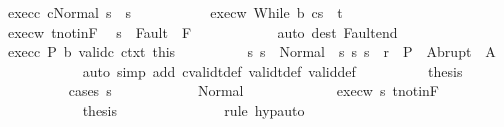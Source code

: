 \begin{isabellebody}
\ exec{\isacharunderscore}c{\isacharcolon}\ {\isachardoublequoteopen}{\isasymGamma}{\isasymturnstile}{\isasymlangle}c{\isacharcomma}Normal\ s{\isasymrangle}\ {\isasymRightarrow}\ s{\isacharprime}{\isachardoublequoteclose}\ \isanewline
\ \ \ \ \ \ \ \ \isamarkupfalse%
\ exec{\isacharunderscore}w{\isacharcolon}\ {\isachardoublequoteopen}{\isasymGamma}{\isasymturnstile}{\isasymlangle}While\ b\ c{\isacharcomma}s{\isacharprime}{\isasymrangle}\ {\isasymRightarrow}\ t{\isachardoublequoteclose}\isanewline
\ \ \ \ \ \ \ \ \isamarkupfalse%
\ exec{\isacharunderscore}w\ t{\isacharunderscore}notin{\isacharunderscore}F\ \isamarkupfalse%
\ {\isachardoublequoteopen}s{\isacharprime}\ {\isasymnotin}\ Fault\ {\isacharbackquote}\ F{\isachardoublequoteclose}\isanewline
\ \ \ \ \ \ \ \ \ \ \isamarkupfalse%
\ {\isacharparenleft}auto\ dest{\isacharcolon}\ Fault{\isacharunderscore}end{\isacharparenright}\isanewline
\ \ \ \ \ \ \ \ \isamarkupfalse%
\ exec{\isacharunderscore}c\ P\ b\ valid{\isacharunderscore}c\ ctxt\ this\isanewline
\ \ \ \ \ \ \ \ \isamarkupfalse%
\ s{\isacharprime}{\isacharcolon}\ {\isachardoublequoteopen}s{\isacharprime}\ {\isasymin}\ Normal\ {\isacharbackquote}\ {\isacharparenleft}{\isacharbraceleft}s{\isacharprime}{\isachardot}\ {\isacharparenleft}s{\isacharprime}{\isacharcomma}\ s{\isacharparenright}\ {\isasymin}\ r{\isacharbraceright}\ {\isasyminter}\ P{\isacharparenright}\ {\isasymunion}\ Abrupt\ {\isacharbackquote}\ A{\isachardoublequoteclose}\isanewline
\ \ \ \ \ \ \ \ \ \ \isamarkupfalse%
\ {\isacharparenleft}auto\ simp\ add{\isacharcolon}\ cvalidt{\isacharunderscore}def\ validt{\isacharunderscore}def\ valid{\isacharunderscore}def{\isacharparenright}\isanewline
\ \ \ \ \ \ \ \ \isamarkupfalse%
\ {\isacharquery}thesis\isanewline
\ \ \ \ \ \ \ \ \isamarkupfalse%
\ {\isacharparenleft}cases\ s{\isacharprime}{\isacharparenright}\isanewline
\ \ \ \ \ \ \ \ \ \ \isamarkupfalse%
\ Normal\ \isanewline
\ \ \ \ \ \ \ \ \ \ \isamarkupfalse%
\ exec{\isacharunderscore}w\ s{\isacharprime}\ t{\isacharunderscore}notin{\isacharunderscore}F\isanewline
\ \ \ \ \ \ \ \ \ \ \isamarkupfalse%
\ {\isacharquery}thesis\isanewline
\ \ \ \ \ \ \ \ \ \ \ \ \isamarkupfalse%
\ {\isacharminus}\ {\isacharparenleft}rule\ hyp{\isacharcomma}auto{\isacharparenright}\isanewline
\ \ \ \ \ \ \ \ \isamarkupfalse%
\isanewline
\ \ \ \ \ \ \ \ \ \ \isamarkupfalse%

\end{isabellebody}

